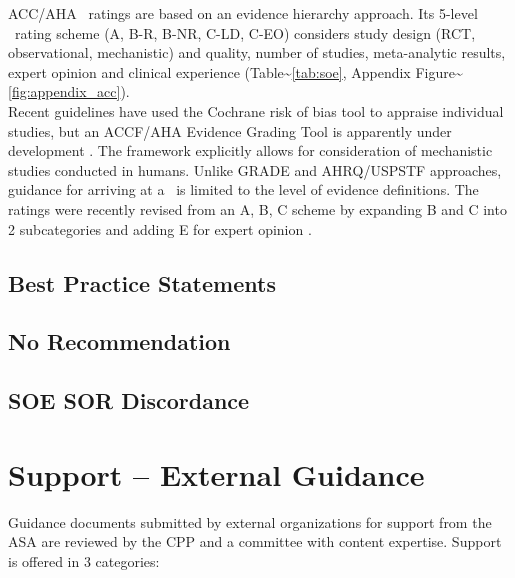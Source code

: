 \documentclass[
  letterpaper,
  DIV=11,
  numbers=noendperiod]{scrreprt}
\begin{document}
ACC/AHA \soe~ratings are based on an evidence hierarchy approach. Its
5-level \soe~rating scheme (A, B-R, B-NR, C-LD, C-EO) considers study
design (RCT, observational, mechanistic) and quality, number of studies,
meta-analytic results, expert opinion and clinical experience
(Table\textasciitilde{}\ref{tab:soe}, Appendix
Figure\textasciitilde{}\ref{fig:appendix_acc}).\\
Recent guidelines \cite{Reboussin2018} have used the Cochrane risk of
bias tool to appraise individual studies, but an ACCF/AHA Evidence
Grading Tool is apparently under development \cite{Jacobs2013}. The
framework explicitly allows for consideration of mechanistic studies
\cite{Goodman2013} conducted in humans. Unlike GRADE and AHRQ/USPSTF
approaches, guidance for arriving at a \soe~is limited to the level of
evidence definitions. The ratings were recently revised from an A, B, C
scheme by expanding B and C into 2 subcategories and adding E for expert
opinion \cite{Jacobs2014}.

\hypertarget{best-practice-statements}{%
\section{Best Practice Statements}\label{best-practice-statements}}

\hypertarget{no-recommendation}{%
\section{No Recommendation}\label{no-recommendation}}

\hypertarget{soe-sor-discordance}{%
\section{SOE SOR Discordance}\label{soe-sor-discordance}}


\hypertarget{support-external-guidance}{%
\chapter{Support -- External Guidance}\label{support-external-guidance}}

Guidance documents submitted by external organizations for support from
the ASA are reviewed by the CPP and a committee with content expertise.
Support is offered in 3 categories:
\end{document}
